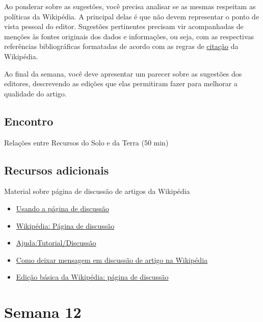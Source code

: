 \documentclass[
  11pt,
  a4paper,
  dvipsnames]{tufte-book}
\providecommand{\tightlist}{%
  \setlength{\itemsep}{0pt}\setlength{\parskip}{0pt}}
\begin{document}
Ao ponderar sobre as sugestões, você precisa analisar se as mesmas respeitam as políticas da Wikipédia. A principal delas é que não devem representar o ponto de vista pessoal do editor. Sugestões pertinentes precisam vir acompanhadas de menções às fontes originais dos dados e informações, ou seja, com as respectivas referências bibliográficas formatadas de acordo com as regras de \href{https://pt.wikipedia.org/wiki/Wikip\%C3\%A9dia:Livro_de_estilo/Cite_as_fontes}{citação} da Wikipédia.

Ao final da semana, você deve apresentar um parecer sobre as sugestões dos editores, descrevendo as edições que elas permitiram fazer para melhorar a qualidade do artigo.

\hypertarget{encontro-4}{%
\section{Encontro}\label{encontro-4}}

Relações entre Recursos do Solo e da Terra (50 min)

\hypertarget{recursos-adicionais-7}{%
\section{Recursos adicionais}\label{recursos-adicionais-7}}

Material sobre página de discussão de artigos da Wikipédia

\begin{itemize}
\tightlist
\item
  \href{https://commons.wikimedia.org/w/index.php?title=File\%3AUsando_a_p\%C3\%A1gina_de_discuss\%C3\%A3o.ogv}{Usando a página de discussão}
\item
  \href{https://pt.wikipedia.org/wiki/Wikip\%C3\%A9dia:P\%C3\%A1gina_de_discuss\%C3\%A3o}{Wikipédia: Página de discussão}
\item
  \href{https://pt.wikipedia.org/wiki/Ajuda:Tutorial/Discuss\%C3\%A3o}{Ajuda:Tutorial/Discussão}
\item
  \href{https://youtu.be/8APJKPMYwRA}{Como deixar mensagem em discussão de artigo na Wikipédia}
\item
  \href{https://youtu.be/BU5Ga_Yz8ZU}{Edição básica da Wikipédia: página de discussão}
\end{itemize}

\hypertarget{semana-12}{%
\chapter{Semana 12}\label{semana-12}}
\end{document}
